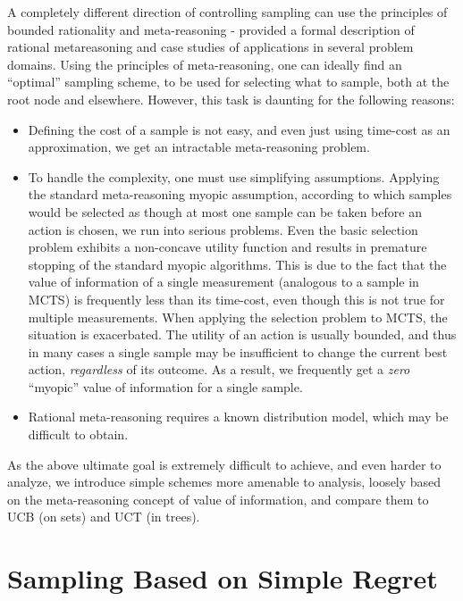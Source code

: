 \documentclass[letterpaper]{article}
\begin{document}
A completely different direction of controlling sampling can use the
principles of bounded rationality \cite{Horvitz.reasoningabout}
and meta-reasoning -  \cite{Russell.right} provided a formal
description of rational metareasoning and case studies of applications
in several problem domains. Using the principles of meta-reasoning,
one can ideally find an ``optimal'' sampling scheme, to be used
for selecting what to sample, both at the root node \cite{HayRussell.MCTS} and elsewhere.
However, this task is daunting for the following reasons:
\begin{itemize}
\item Defining the cost of a sample is not easy, and even just
  using time-cost as an approximation, we get an intractable
  meta-reasoning problem.
\item To handle the complexity, one must use simplifying assumptions.
      Applying the standard meta-reasoning myopic assumption, according to 
    which samples would be selected as though at most one sample
   can be taken before an action is chosen, we run into serious problems. Even the basic
  selection problem \cite{TolpinShimony.blinkered} exhibits a
  non-concave utility function and results in premature stopping of the
  standard myopic algorithms. This is due to the fact that the value of information of
  a single measurement (analogous to a sample in MCTS) is frequently
  less than its time-cost, even though this is not true for multiple
  measurements.  When applying the selection problem to MCTS, the
  situation is exacerbated.  The utility of an action is usually
  bounded, and thus in many cases a single sample may be insufficient
  to change the current best action, \emph{regardless} of its
  outcome. As a result, we frequently get a \emph{zero} ``myopic''
  value of information for a single sample.
\item Rational meta-reasoning requires a known distribution model, which may be
  difficult to obtain.
\end{itemize}

As the above ultimate goal is extremely difficult
to achieve, and even harder to analyze, we introduce
simple schemes more amenable to analysis, loosely based on the meta-reasoning
concept of value of information, and compare
them to UCB (on sets) and UCT (in trees).

\section{Sampling Based on Simple Regret}
\label{sec:results}
\end{document}
